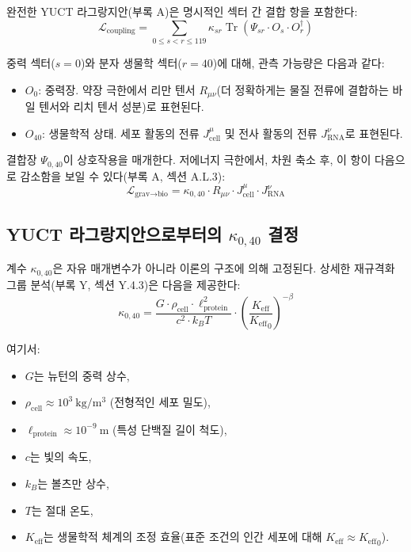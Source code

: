\documentclass[12pt,a4paper]{article}
\theoremstyle{remark}
\newcommand{\Keff}{K_{\mathrm{eff}}}
\begin{document}
	완전한 YUCT 라그랑지안(부록 A)은 명시적인 섹터 간 결합 항을 포함한다:
	\begin{equation}
		\mathcal{L}_{\text{coupling}} = \sum_{0 \le s < r \le 119} \kappa_{sr} \operatorname{Tr}(\Psi_{sr} \cdot O_s \cdot O_r^\dagger)
		\label{eq:full-coupling}
	\end{equation}
	
	중력 섹터(\(s=0\))와 분자 생물학 섹터(\(r=40\))에 대해, 관측 가능량은 다음과 같다:
	\begin{itemize}
		\item \(O_0\): 중력장. 약장 극한에서 리만 텐서 \(R_{\mu\nu}\)(더 정확하게는 물질 전류에 결합하는 바일 텐서와 리치 텐서 성분)로 표현된다.
		\item \(O_{40}\): 생물학적 상태. 세포 활동의 전류 \(J_{\text{cell}}^\mu\) 및 전사 활동의 전류 \(J_{\text{RNA}}^\nu\)로 표현된다.
	\end{itemize}
	
	결합장 \(\Psi_{0,40}\)이 상호작용을 매개한다. 저에너지 극한에서, 차원 축소 후, 이 항이 다음으로 감소함을 보일 수 있다(부록 A, 섹션 A.L.3):
	\begin{equation}
		\mathcal{L}_{\text{grav}\to\text{bio}} = \kappa_{0,40} \cdot R_{\mu\nu} \cdot J_{\text{cell}}^\mu \cdot J_{\text{RNA}}^\nu
		\label{eq:coupling-raw}
	\end{equation}
	
	\subsection{YUCT 라그랑지안으로부터의 \(\kappa_{0,40}\) 결정}
	
	계수 \(\kappa_{0,40}\)은 자유 매개변수가 아니라 이론의 구조에 의해 고정된다. 상세한 재규격화 그룹 분석(부록 Y, 섹션 Y.4.3)은 다음을 제공한다:
	\begin{equation}
		\kappa_{0,40} = \frac{G \cdot \rho_{\text{cell}} \cdot \ell_{\text{protein}}^2}{c^2 \cdot k_B T} \cdot \left( \frac{\Keff}{{\Keff}_0} \right)^{-\beta}
		\label{eq:kappa-exact}
	\end{equation}
	
	여기서:
	\begin{itemize}
		\item \(G\)는 뉴턴의 중력 상수,
		\item \(\rho_{\text{cell}} \approx 10^3\ \mathrm{kg/m^3}\) (전형적인 세포 밀도),
		\item \(\ell_{\text{protein}} \approx 10^{-9}\ \mathrm{m}\) (특성 단백질 길이 척도),
		\item \(c\)는 빛의 속도,
		\item \(k_B\)는 볼츠만 상수,
		\item \(T\)는 절대 온도,
		\item \(\Keff\)는 생물학적 체계의 조정 효율(표준 조건의 인간 세포에 대해 \(\Keff \approx {\Keff}_0\)).
	\end{itemize}
	
\end{document}
